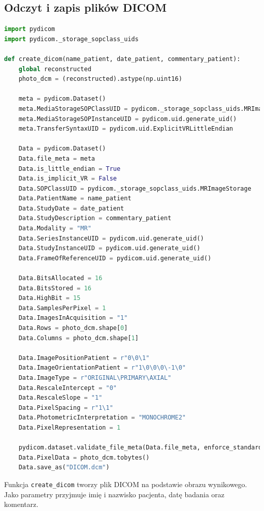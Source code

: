 \documentclass[11pt,a4paper]{article}
\begin{document}
    \subsection{Odczyt i zapis plików DICOM}
    \begin{lstlisting}[language=Python, basicstyle=\normal, breaklines=true]
import pydicom
import pydicom._storage_sopclass_uids

def create_dicom(name_patient, date_patient, commentary_patient):
    global reconstructed
    photo_dcm = (reconstructed).astype(np.uint16)

    meta = pydicom.Dataset()
    meta.MediaStorageSOPClassUID = pydicom._storage_sopclass_uids.MRImageStorage
    meta.MediaStorageSOPInstanceUID = pydicom.uid.generate_uid()
    meta.TransferSyntaxUID = pydicom.uid.ExplicitVRLittleEndian

    Data = pydicom.Dataset()
    Data.file_meta = meta
    Data.is_little_endian = True
    Data.is_implicit_VR = False
    Data.SOPClassUID = pydicom._storage_sopclass_uids.MRImageStorage
    Data.PatientName = name_patient
    Data.StudyDate = date_patient
    Data.StudyDescription = commentary_patient
    Data.Modality = "MR"
    Data.SeriesInstanceUID = pydicom.uid.generate_uid()
    Data.StudyInstanceUID = pydicom.uid.generate_uid()
    Data.FrameOfReferenceUID = pydicom.uid.generate_uid()

    Data.BitsAllocated = 16
    Data.BitsStored = 16
    Data.HighBit = 15
    Data.SamplesPerPixel = 1
    Data.ImagesInAcquisition = "1"
    Data.Rows = photo_dcm.shape[0]
    Data.Columns = photo_dcm.shape[1]

    Data.ImagePositionPatient = r"0\0\1"
    Data.ImageOrientationPatient = r"1\0\0\0\-1\0"
    Data.ImageType = r"ORIGINAL\PRIMARY\AXIAL"
    Data.RescaleIntercept = "0"
    Data.RescaleSlope = "1"
    Data.PixelSpacing = r"1\1"
    Data.PhotometricInterpretation = "MONOCHROME2"
    Data.PixelRepresentation = 1

    pydicom.dataset.validate_file_meta(Data.file_meta, enforce_standard=True)
    Data.PixelData = photo_dcm.tobytes()
    Data.save_as("DICOM.dcm")
    \end{lstlisting}
    Funkcja \texttt{create\_dicom} tworzy plik DICOM na podstawie obrazu wynikowego.
    Jako parametry przyjmuje imię i nazwisko pacjenta, datę badania oraz komentarz.
\end{document}
